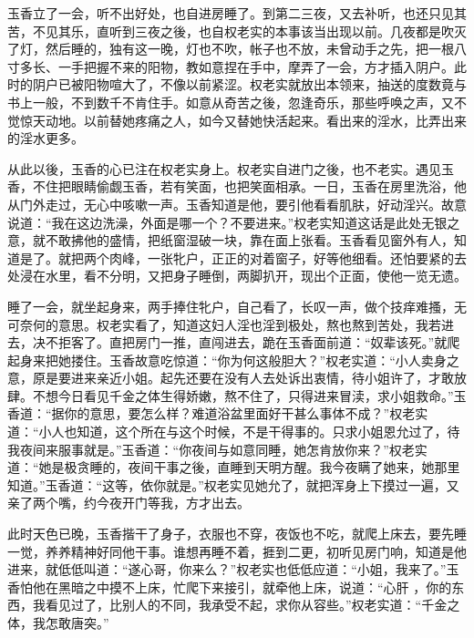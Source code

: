 \documentclass[a4paper,12pt,UTF8,twoside]{ctexbook}
\begin{document}
玉香立了一会，听不出好处，也自进房睡了。到第二三夜，又去补听，也还只见其苦，不见其乐，直听到三夜之後，也自权老实的本事该当出现以前。几夜都是吹灭了灯，然后睡的，独有这一晚，灯也不吹，帐子也不放，未曾动手之先，把一根八寸多长、一手把握不来的阳物，教如意捏在手中，摩弄了一会，方才插入阴户。此时的阴户已被阳物喧大了，不像以前紧涩。权老实就放出本领来，抽送的度数竟与书上一般，不到数千不肯住手。如意从奇苦之後，忽逢奇乐，那些呼唤之声，又不觉惊天动地。以前替她疼痛之人，如今又替她快活起来。看出来的淫水，比弄出来的淫水更多。

从此以後，玉香的心已注在权老实身上。权老实自进门之後，也不老实。遇见玉香，不住把眼睛偷觑玉香，若有笑面，也把笑面相承。一日，玉香在房里洗浴，他从门外走过，无心中咳嗽一声。玉香知道是他，要引他看看肌肤，好动淫兴。故意说道：“我在这边洗澡，外面是哪一个？不要进来。”权老实知道这话是此处无银之意，就不敢拂他的盛情，把纸窗湿破一块，靠在面上张看。玉香看见窗外有人，知道是了。就把两个肉峰，一张牝户，正正的对着窗子，好等他细看。还怕要紧的去处浸在水里，看不分明，又把身子睡倒，两脚扒开，现出个正面，使他一览无遗。

睡了一会，就坐起身来，两手捧住牝户，自己看了，长叹一声，做个技痒难搔，无可奈何的意思。权老实看了，知道这妇人淫也淫到极处，熬也熬到苦处，我若进去，决不拒客了。直把房门一推，直闯进去，跪在玉香面前道：“奴辈该死。”就爬起身来把她搂住。玉香故意吃惊道：“你为何这般胆大？”权老实道：“小人卖身之意，原是要进来亲近小姐。起先还要在没有人去处诉出衷情，待小姐许了，才敢放肆。不想今日看见千金之体生得娇嫩，熬不住了，只得进来冒渎，求小姐救命。”玉香道：“据你的意思，要怎么样？难道浴盆里面好干甚么事体不成？”权老实道：“小人也知道，这个所在与这个时候，不是干得事的。只求小姐恩允过了，待我夜间来服事就是。”玉香道：“你夜间与如意同睡，她怎肯放你来？”权老实道：“她是极贪睡的，夜间干事之後，直睡到天明方醒。我今夜瞒了她来，她那里知道。”玉香道：“这等，依你就是。”权老实见她允了，就把浑身上下摸过一遍，又亲了两个嘴，约今夜开门等我，方才出去。

此时天色已晚，玉香揩干了身子，衣服也不穿，夜饭也不吃，就爬上床去，要先睡一觉，养养精神好同他干事。谁想再睡不着，捱到二更，初听见房门响，知道是他进来，就低低叫道：“遂心哥，你来么？”权老实也低低应道：“小姐，我来了。”玉香怕他在黑暗之中摸不上床，忙爬下来接引，就牵他上床，说道：“心肝 ，你的东西，我看见过了，比别人的不同，我承受不起，求你从容些。”权老实道：“千金之体，我怎敢唐突。”
\end{document}
